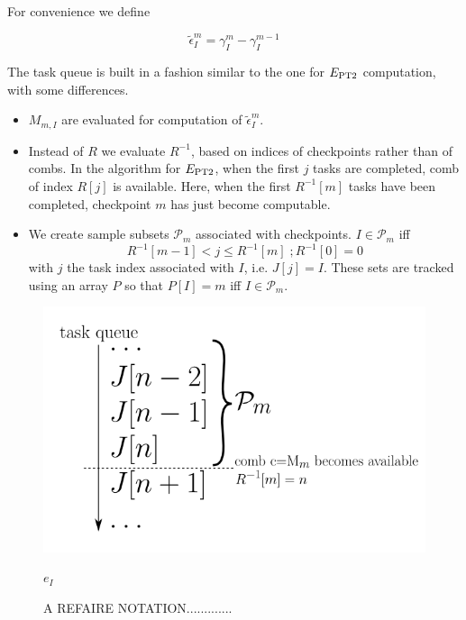 \documentclass[./thesis.tex]{subfiles}
\begin{document}
For convenience we define

\begin{equation}
\tilde \epsilon^m_I = \gamma^m_I - \gamma^{m-1}_I
\end{equation}


The task queue is built in a fashion similar to the one for $E_\text{PT2}$ computation, with some differences.
\begin{itemize}
\item
$M_{m,I}$ are evaluated for computation of $\tilde \epsilon^m_I$.
\item
Instead of $R$ we evaluate $R^{-1}$, based on indices of checkpoints rather than of combs. In the algorithm for $E_\text{PT2}$, when the first $j$ tasks are completed, comb of index $R[j]$ is available. Here, when the first $R^{-1}[m]$ tasks have been completed, checkpoint $m$ has just become computable.
\item
We create sample subsets $\mathcal{P}_m$ associated with checkpoints. $I \in \mathcal{P}_m$ iff
\begin{equation}
R^{-1}[m-1] < j \leq R^{-1}[m]  \;; R^{-1}[0] = 0
\end{equation}
with $j$ the task index associated with $I$, i.e. $J[j]=I$. These sets are tracked using an array $P$ so that $P[I]=m$ iff $I \in \mathcal{P}_m$.

\end{itemize}

\begin{figure}[h!]
	\begin{center}
		\includegraphics[width=0.7\columnwidth]{figures/matrix_dressing/taskqueue}
		\caption{A REFAIRE NOTATION.............}
		\label{fig:eici2}
		$e_I$
	\end{center}
\end{figure}
\end{document}
